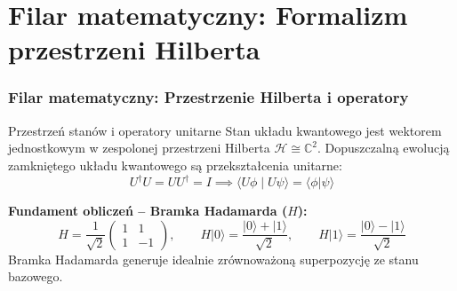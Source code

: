 \documentclass[aspectratio=169]{beamer}
\newcommand{\ket}[1]{\lvert #1 \rangle}
\newcommand{\braket}[2]{\langle #1 \vert #2 \rangle}
\begin{document}
\section{Filar matematyczny: Formalizm przestrzeni Hilberta}
\begin{frame}
    \frametitle{Filar matematyczny: Przestrzenie Hilberta i operatory}

    \begin{exampleblock}{Przestrzeń stanów i operatory unitarne}
        Stan układu kwantowego jest wektorem jednostkowym w zespolonej przestrzeni Hilberta $\mathcal{H} \cong \mathbb{C}^2$. Dopuszczalną ewolucją zamkniętego układu kwantowego są przekształcenia unitarne:
        \begin{equation*}
            U^\dagger U = U U^\dagger = I \implies \langle U\phi \mid U\psi \rangle = \braket{\phi}{\psi}
        \end{equation*}
    \end{exampleblock}

    \vspace{0.2cm}
    \textbf{Fundament obliczeń – Bramka Hadamarda ($H$):}
    \begin{equation*}
        H = \frac{1}{\sqrt{2}} \begin{pmatrix} 1 & 1 \\ 1 & -1 \end{pmatrix}, \qquad
        H \ket{0} = \frac{\ket{0} + \ket{1}}{\sqrt{2}}, \qquad
        H \ket{1} = \frac{\ket{0} - \ket{1}}{\sqrt{2}}
    \end{equation*}
    Bramka Hadamarda generuje idealnie zrównoważoną superpozycję ze stanu bazowego.
\end{frame}
\end{document}
